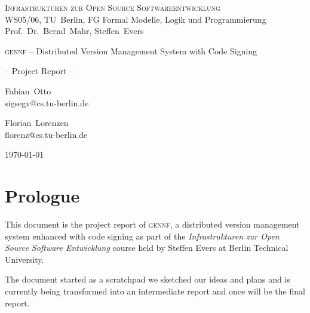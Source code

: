\documentclass[fleqn, 10pt, a4paper]{report} \usepackage{amssymb}
\newcommand{\GENNF}{\textsc{gennf}}
\begin{document}
\thispagestyle{empty}
\begin{center}
  {\scshape Infrastrukturen zur Open Source Softwareentwicklung} \\
  WS05/06, TU~Berlin, FG Formal Modelle, Logik und
  Programmierung \\
  Prof.~Dr.~Bernd~Mahr, Steffen~Evers \bigskip \bigskip

  {\LARGE \GENNF{} -- Distributed Version Management System with Code
    Signing} \medskip

  {\Large -- Project Report --} \bigskip \bigskip

  {\large
    \begin{minipage}[t]{0.35\linewidth}
      \begin{center}
        Fabian~Otto \\ \vspace{-2mm} {\scriptsize\ttfamily
          sigsegv@cs.tu-berlin.de}
      \end{center}
    \end{minipage}\hspace{8mm}
    \begin{minipage}[t]{0.35\linewidth}
      \begin{center}
        Florian~Lorenzen \\ \vspace{-2mm} {\scriptsize\ttfamily
          florenz@cs.tu-berlin.de}
      \end{center}
    \end{minipage}
    \bigskip \bigskip

    \today}

\end{center}

\tableofcontents
\newpage

\section*{Prologue}

This document is the project report of \GENNF{}, a distributed version
management system enhanced with code signing as part of the
\emph{Infrastrukturen zur Open Source Software Entwicklung} course
held by Steffen Evers at Berlin Technical University.

The document started as a scratchpad we sketched our ideas and plans
and is currently being transformed into an intermediate report and
once will be the final report.
\end{document}
